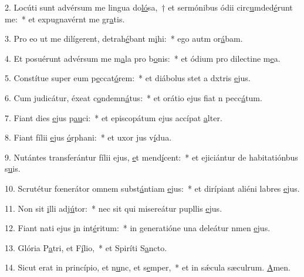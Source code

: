 2. Locúti sunt advérsum me lingua do\uline{ló}sa,~† et sermónibus ódii circ\uline{u}mded\uline{é}runt me:~* et expugnavérnt me gr\uline{a}tis.\par 
3. Pro eo ut me dilígerent, detrah\uline{é}bant m\uline{i}hi:~* ego autm or\uline{á}bam.\par 
4. Et posuérunt advérsum me m\uline{a}la pro b\uline{o}nis:~* et ódium pro dilectine m\uline{e}a.\par 
5. Constítue super eum p\uline{e}ccat\uline{ó}rem:~* et diábolus stet a dxtris \uline{e}jus.\par 
6. Cum judicátur, éxeat c\uline{o}ndemn\uline{á}tus:~* et orátio ejus fiat n pecc\uline{á}tum.\par 
7. Fiant dies \uline{e}jus p\uline{au}ci:~* et episcopátum ejus accípat \uline{a}lter.\par 
8. Fiant fílii \uline{e}jus \uline{ó}rphani:~* et uxor jus v\uline{í}dua.\par 
9. Nutántes transferántur fílii ejus, \uline{e}t mend\uline{í}cent:~* et ejiciántur de habitatiónbus s\uline{u}is.\par 
10. Scrutétur fœnerátor omnem subst\uline{á}ntiam \uline{e}jus:~* et dirípiant aliéni labres \uline{e}jus.\par 
11. Non sit \uline{i}lli adj\uline{ú}tor:~* nec sit qui misereátur pupllis \uline{e}jus.\par 
12. Fiant nati ejus \uline{i}n int\uline{é}ritum:~* in generatióne una deleátur nmen \uline{e}jus.\par 
13. Glória P\uline{a}tri, et F\uline{í}lio,~* et Spiríti S\uline{a}ncto.\par 
14. Sicut erat in princípio, et n\uline{u}nc, et s\uline{e}mper,~* et in sǽcula sæculrum. \uline{A}men.\par 
